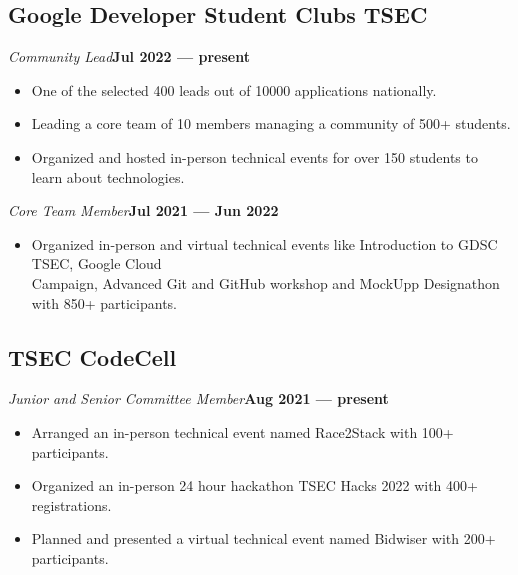 \documentclass[a4,10pt]{article}
\newenvironment{zitemize}{
\begin{itemize}\itemsep0pt \parskip0pt \parsep1pt}
{\end{itemize}\vspace{-0.5cm}}
\begin{document}
\vspace{-0.1cm}
\subsection*{ Google Developer Student Clubs TSEC } 
\vspace{-0.05cm}
    \emph{Community Lead}\textbf{\hfill Jul 2022 --- present}
    \begin{zitemize}
    \vspace{-0.2cm}
            \item One of the selected 400 leads out of 10000 applications nationally.
            \item Leading a core team of 10 members managing a community of 500+ students.
            \item Organized and hosted in-person technical events for over 150 students to learn about technologies.
    \end{zitemize}
    \vspace{0.4cm}
    \emph{Core Team Member}\textbf{\hfill Jul 2021 --- Jun 2022}
    \begin{zitemize}
    \vspace{-0.2cm}
            \item Organized in-person and virtual technical events like Introduction to GDSC TSEC, Google Cloud \\Campaign, Advanced Git and GitHub workshop and MockUpp Designathon with 850+ participants.
    \end{zitemize}
    \vspace{-0.05cm}
    
\subsection*{ TSEC CodeCell }
\vspace{-0.05cm}
    \emph{Junior and Senior Committee Member}\textbf{\hfill Aug 2021 --- present}
    \begin{zitemize}
    \vspace{-0.25cm}
            \item Arranged an in-person technical event named Race2Stack with 100+ participants.
            \item Organized an in-person 24 hour hackathon TSEC Hacks 2022 with 400+ registrations.
            \item Planned and presented a virtual technical event named Bidwiser with 200+ participants.
    \end{zitemize}
\vspace{-0.2cm}
\end{document}
